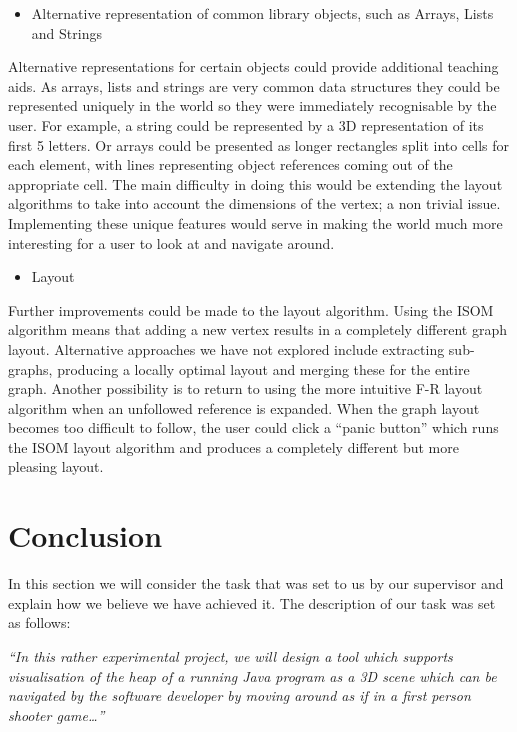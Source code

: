 \documentclass[11pt, a4paper]{report}
\begin{document}
\begin{itemize}
  \item Alternative representation of common library objects, such as Arrays, Lists and Strings
\end{itemize}

Alternative representations for certain objects could provide additional teaching aids. As arrays, lists and strings are very common data structures they could be represented uniquely in the world so they were immediately recognisable by the user. For example, a string could be represented by a 3D representation of its first 5 letters. Or arrays could be presented as longer rectangles split into cells for each element, with lines representing object references coming out of the appropriate cell. The main difficulty in doing this would be extending the layout algorithms to take into account the dimensions of the vertex; a non trivial issue. Implementing these unique features would serve in making the world much more interesting for a user to look at and navigate around.

\begin{itemize}
  \item Layout
\end{itemize}

Further improvements could be made to the layout algorithm. Using the ISOM algorithm means that adding a new vertex results in a completely different graph layout. Alternative approaches we have not explored include extracting sub-graphs, producing a locally optimal layout and merging these for the entire graph. Another possibility is to return to using the more intuitive F-R layout algorithm when an unfollowed reference is expanded. When the graph layout becomes too difficult to follow, the user could click a ``panic button'' which runs the ISOM layout algorithm and produces a completely different but more pleasing layout.

\chapter{Conclusion}

In this section we will consider the task that was set to us by our supervisor and explain how we believe we have achieved it. The description of our task was set as follows:

\emph{``In this rather experimental project, we will design a tool which supports visualisation of the heap of a running Java program as a 3D scene which can be navigated by the software developer by moving around as if in a first person shooter game…''}
\end{document}
